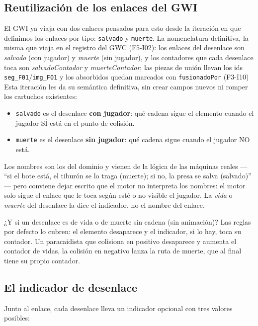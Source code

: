 \subsection{Reutilización de los enlaces del GWI}

El GWI ya viaja con dos enlaces pensados para esto desde la iteración 
en que definimos los enlaces por tipo: \texttt{salvado} y \texttt{muerte}. La nomenclatura
definitiva, la misma que viaja en el registro del GWC (F5-I02): los
enlaces del desenlace son \emph{salvado} (con jugador) y
\emph{muerte} (sin jugador), y los contadores que cada desenlace
toca son \emph{salvadoContador} y \emph{muerteContador}; las piezas
de unión llevan los ids \texttt{seg\_F01}/\texttt{img\_F01} y los
absorbidos quedan marcados con \texttt{fusionadoPor} (F3-I10)
Esta
iteración les da su semántica definitiva, sin crear campos nuevos ni
romper los cartuchos existentes:

\begin{itemize}
	\item \texttt{salvado} es el desenlace \textbf{con jugador}: qué
	cadena sigue el elemento cuando el jugador SÍ está en el punto de
	colisión.
	
	\item \texttt{muerte} es el desenlace \textbf{sin jugador}: qué
	cadena sigue cuando el jugador NO está.
\end{itemize}

Los nombres son los del dominio y vienen de la lógica de las máquinas
reales — ``si el bote está, el tiburón se lo traga (muerte); si no, la
presa se salva (salvado)'' — pero conviene dejar escrito que el motor
no interpreta los nombres: el motor solo sigue el enlace que le toca
según esté o no visible el jugador. La \emph{vida} o \emph{muerte} del
desenlace la dice el indicador, no el nombre del enlace.

¿Y si un desenlace es de vida o de muerte sin cadena (sin animación)?
Las reglas por defecto lo cubren: el elemento desaparece y el
indicador, si lo hay, toca su contador. Un paracaidista que colisiona 
en positivo desaparece y aumenta el contador de vidas, la colisión en 
negativo lanza la ruta de muerte, que al final tiene su propio contador.

\subsection{El indicador de desenlace}

Junto al enlace, cada desenlace lleva un indicador opcional con tres
valores posibles:


